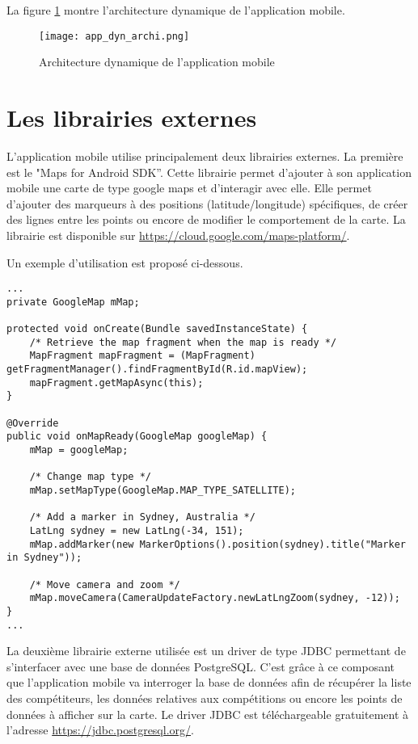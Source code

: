 La figure \ref{fig:app_dyn_archi} montre l'architecture dynamique de l'application mobile. 

\begin{figure}[htb]
\centering 
\texttt{[image: app\_dyn\_archi.png]} 
\caption{Architecture dynamique de l'application mobile}
\label{fig:app_dyn_archi}
\end{figure}

\section{Les librairies externes}

L'application mobile utilise principalement deux librairies externes. La première est le "Maps for Android SDK”. Cette librairie permet d'ajouter à son application mobile une carte de type google maps et d'interagir avec elle. Elle permet d'ajouter des marqueurs à des positions (latitude/longitude) spécifiques, de créer des lignes entre les points ou encore de modifier le comportement de la carte. La librairie est disponible sur \url{https://cloud.google.com/maps-platform/}.

Un exemple d'utilisation est proposé ci-dessous.

\begin{lstlisting}[style=JavaStyle]
...
private GoogleMap mMap;

protected void onCreate(Bundle savedInstanceState) {
	/* Retrieve the map fragment when the map is ready */
	MapFragment mapFragment = (MapFragment) getFragmentManager().findFragmentById(R.id.mapView);
	mapFragment.getMapAsync(this);
}

@Override
public void onMapReady(GoogleMap googleMap) {
	mMap = googleMap;

	/* Change map type */
	mMap.setMapType(GoogleMap.MAP_TYPE_SATELLITE);

	/* Add a marker in Sydney, Australia */
	LatLng sydney = new LatLng(-34, 151);
	mMap.addMarker(new MarkerOptions().position(sydney).title("Marker in Sydney"));

	/* Move camera and zoom */
	mMap.moveCamera(CameraUpdateFactory.newLatLngZoom(sydney, -12));
}
...
\end{lstlisting}

La deuxième librairie externe utilisée est un driver de type JDBC permettant de s'interfacer avec une base de données PostgreSQL. C'est grâce à ce composant que l'application mobile va interroger la base de données afin de récupérer la liste des compétiteurs, les données relatives aux compétitions ou encore les points de données à afficher sur la carte. Le driver JDBC est téléchargeable gratuitement à l'adresse \url{https://jdbc.postgresql.org/}.

